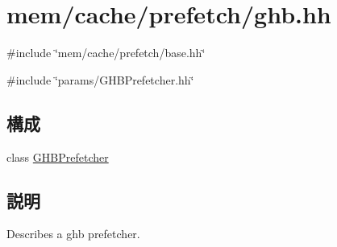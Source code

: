 \hypertarget{ghb_8hh}{
\section{mem/cache/prefetch/ghb.hh}
\label{ghb_8hh}
}
{\ttfamily \#include \char`\"{}mem/cache/prefetch/base.hh\char`\"{}}\par
{\ttfamily \#include \char`\"{}params/GHBPrefetcher.hh\char`\"{}}\par
\subsection*{構成}
\begin{DoxyCompactItemize}
\item 
class \hyperlink{classGHBPrefetcher}{GHBPrefetcher}
\end{DoxyCompactItemize}


\subsection{説明}
Describes a ghb prefetcher. 